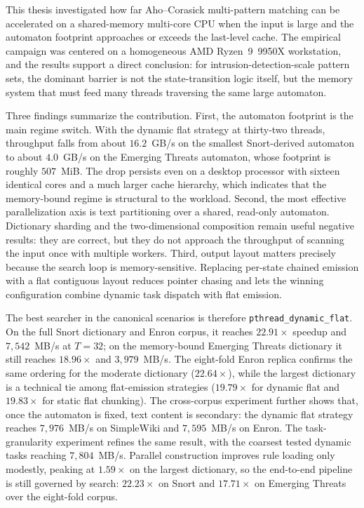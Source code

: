 This thesis investigated how far Aho--Corasick multi-pattern matching can be
accelerated on a shared-memory multi-core CPU when the input is large and the
automaton footprint approaches or exceeds the last-level cache. The empirical
campaign was centered on a homogeneous AMD Ryzen~9~9950X workstation, and the
results support a direct conclusion: for intrusion-detection-scale pattern sets,
the dominant barrier is not the state-transition logic itself, but the memory
system that must feed many threads traversing the same large automaton.

Three findings summarize the contribution. First, the automaton footprint is the
main regime switch. With the dynamic flat strategy at thirty-two threads,
throughput falls from about $16.2$~GB/s on the smallest Snort-derived automaton
to about $4.0$~GB/s on the Emerging Threats automaton, whose footprint is roughly
$507$~MiB. The drop persists even on a desktop processor with sixteen identical
cores and a much larger cache hierarchy, which indicates that the memory-bound
regime is structural to the workload. Second, the most effective parallelization
axis is text partitioning over a shared, read-only automaton. Dictionary sharding
and the two-dimensional composition remain useful negative results: they are
correct, but they do not approach the throughput of scanning the input once with
multiple workers. Third, output layout matters precisely because the search loop
is memory-sensitive. Replacing per-state chained emission with a flat contiguous
layout reduces pointer chasing and lets the winning configuration combine dynamic
task dispatch with flat emission.

The best searcher in the canonical scenarios is therefore
\texttt{pthread\_dynamic\_flat}. On the full Snort dictionary and Enron corpus,
it reaches $22.91\times$ speedup and $7{,}542$~MB/s at $T=32$; on the
memory-bound Emerging Threats dictionary it still reaches $18.96\times$ and
$3{,}979$~MB/s. The eight-fold Enron replica confirms the same ordering for the
moderate dictionary ($22.64\times$), while the largest dictionary is a technical
tie among flat-emission strategies ($19.79\times$ for dynamic flat and
$19.83\times$ for static flat chunking). The cross-corpus experiment further
shows that, once the automaton is fixed, text content is secondary: the dynamic
flat strategy reaches $7{,}976$~MB/s on SimpleWiki and $7{,}595$~MB/s on Enron.
The task-granularity experiment refines the same result, with the coarsest tested
dynamic tasks reaching $7{,}804$~MB/s. Parallel construction improves rule
loading only modestly, peaking at $1.59\times$ on the largest dictionary, so the
end-to-end pipeline is still governed by search: $22.23\times$ on Snort and
$17.71\times$ on Emerging Threats over the eight-fold corpus.

